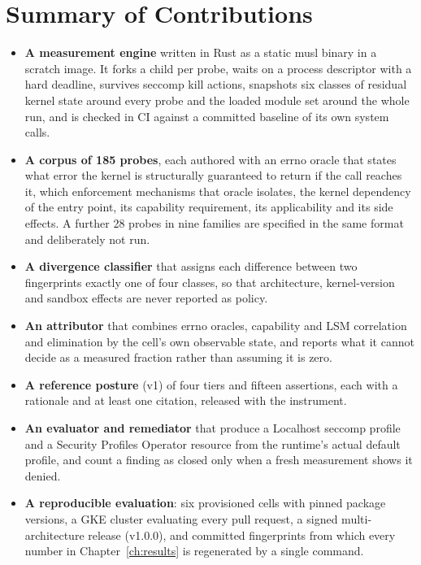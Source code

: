 \section{Summary of Contributions}

\begin{itemize}[leftmargin=*]
\item \textbf{A measurement engine} written in Rust as a static musl binary in a scratch image. It forks a child per probe, waits on a process descriptor with a hard deadline, survives seccomp kill actions, snapshots six classes of residual kernel state around every probe and the loaded module set around the whole run, and is checked in CI against a committed baseline of its own system calls.
\item \textbf{A corpus of 185 probes}, each authored with an errno oracle that states what error the kernel is structurally guaranteed to return if the call reaches it, which enforcement mechanisms that oracle isolates, the kernel dependency of the entry point, its capability requirement, its applicability and its side effects. A further 28 probes in nine families are specified in the same format and deliberately not run.
\item \textbf{A divergence classifier} that assigns each difference between two fingerprints exactly one of four classes, so that architecture, kernel-version and sandbox effects are never reported as policy.
\item \textbf{An attributor} that combines errno oracles, capability and LSM correlation and elimination by the cell's own observable state, and reports what it cannot decide as a measured fraction rather than assuming it is zero.
\item \textbf{A reference posture} (v1) of four tiers and fifteen assertions, each with a rationale and at least one citation, released with the instrument.
\item \textbf{An evaluator and remediator} that produce a Localhost seccomp profile and a Security Profiles Operator resource from the runtime's actual default profile, and count a finding as closed only when a fresh measurement shows it denied.
\item \textbf{A reproducible evaluation}: six provisioned cells with pinned package versions, a GKE cluster evaluating every pull request, a signed multi-architecture release (v1.0.0), and committed fingerprints from which every number in Chapter~\ref{ch:results} is regenerated by a single command.
\end{itemize}

